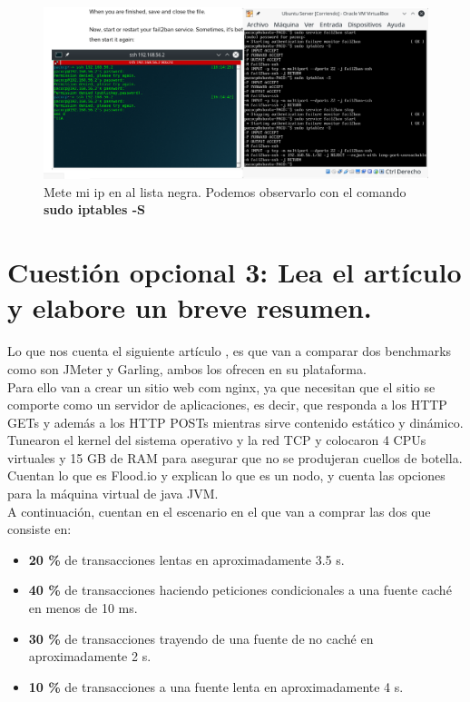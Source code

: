 \begin{figure}[H] %
	\centering
	\includegraphics[scale=0.25]{figuras/figura25.png}  %
	
	
	\caption{Mete mi ip en al lista negra. Podemos observarlo con el comando \textbf{sudo iptables -S}}
	\label{figura25}
\end{figure}



\section{Cuestión opcional 3: Lea el artículo y elabore un breve resumen.}

Lo que nos cuenta el siguiente artículo \cite{articulo}, es que van a comparar dos benchmarks como son JMeter y Garling, ambos los ofrecen en su plataforma.\\
Para ello van a crear un sitio web com  nginx, ya que necesitan que el sitio se comporte como un servidor de aplicaciones, es decir, que responda a los HTTP GETs y además a los HTTP POSTs mientras sirve contenido estático y dinámico. Tunearon el kernel del sistema operativo y la red TCP y colocaron 4 CPUs virtuales y 15 GB de RAM para asegurar que no se produjeran cuellos de botella.\\

Cuentan lo que es Flood.io y explican lo que es un nodo, y cuenta las opciones para la máquina virtual de java JVM.\\
A continuación, cuentan en el escenario en el que van a comprar las dos que consiste en:
\begin{itemize}
	\item \textbf{20 \%} de transacciones lentas en aproximadamente 3.5 s.
	\item \textbf{40 \%} de transacciones haciendo peticiones condicionales a una fuente caché en menos de 10 ms.
	\item \textbf{30 \%} de transacciones trayendo de una fuente de no caché en aproximadamente 2 s.
	\item \textbf{10 \%} de transacciones  a una fuente lenta en aproximadamente 4 s.
\end{itemize}

